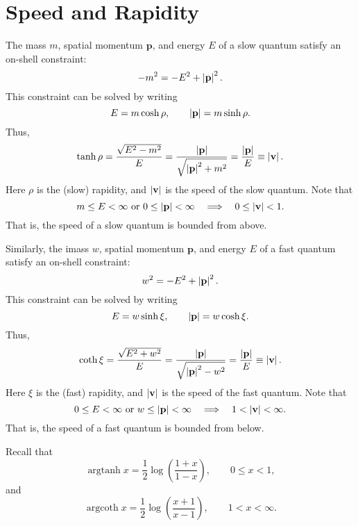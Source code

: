 \section{Speed and Rapidity}
The mass $m$, spatial momentum $\mathbf{p}$, and energy $E$ of a slow quantum satisfy an on-shell constraint:
\begin{equation}
	{-m^{2}} = {-E^{2}} + \left\lvert \mathbf{p} \right\rvert^{2}.
\end{equation}
This constraint can be solved by writing
\begin{equation}
	E = m \operatorname{cosh}{\rho}, \qquad \left\lvert \mathbf{p} \right\rvert = m \operatorname{sinh}{\rho}.
\end{equation}
Thus,
\begin{equation}
	\operatorname{tanh}{\rho} = \frac{\sqrt{E^{2} - m^{2}}}{E} = \frac{\left\lvert \mathbf{p} \right\rvert}{\sqrt{\left\lvert \mathbf{p} \right\rvert^{2} + m^{2}}} = \frac{\left\lvert \mathbf{p} \right\rvert}{E} \equiv \left\lvert \mathbf{v} \right\rvert.
\end{equation}
Here $\rho$ is the (slow) rapidity, and $\left\lvert \mathbf{v} \right\rvert$ is the speed of the slow quantum. Note that
\begin{equation}
	m \leq E < \infty \text{ or } 0 \leq \left\lvert \mathbf{p} \right\rvert < \infty \quad \Longrightarrow \quad 0 \leq \left\lvert \mathbf{v} \right\rvert < 1.
\end{equation}
That is, the speed of a slow quantum is bounded from above.

Similarly, the imass $w$, spatial momentum $\mathbf{p}$, and energy $E$ of a fast quantum satisfy an on-shell constraint:
\begin{equation}
	{w^{2}} = {-E^{2}} + \left\lvert \mathbf{p} \right\rvert^{2}.
\end{equation}
This constraint can be solved by writing
\begin{equation}
	E = w \operatorname{sinh}{\xi}, \qquad \left\lvert \mathbf{p} \right\rvert = w \operatorname{cosh}{\xi}.
\end{equation}
Thus,
\begin{equation}
	\operatorname{coth}{\xi} = \frac{\sqrt{E^{2} + w^{2}}}{E} = \frac{\left\lvert \mathbf{p} \right\rvert}{\sqrt{\left\lvert \mathbf{p} \right\rvert^{2} - w^{2}}} = \frac{\left\lvert \mathbf{p} \right\rvert}{E} \equiv \left\lvert \mathbf{v} \right\rvert.
\end{equation}
Here $\xi$ is the (fast) rapidity, and $\left\lvert \mathbf{v} \right\rvert$ is the speed of the fast quantum. Note that
\begin{equation}
	0 \leq E < \infty \text{ or } w \leq \left\lvert \mathbf{p} \right\rvert < \infty \quad \Longrightarrow \quad 1 < \left\lvert \mathbf{v} \right\rvert < \infty.
\end{equation}
That is, the speed of a fast quantum is bounded from below.

Recall that
\begin{equation}
	\operatorname{argtanh}{x} = \frac{1}{2} \log{\left( \frac{1 + x}{1 - x} \right)}, \qquad 0 \leq x < 1,
\end{equation}
and
\begin{equation}
	\operatorname{argcoth}{x} = \frac{1}{2} \log{\left( \frac{x + 1}{x - 1} \right)}, \qquad 1 < x < \infty.
\end{equation}